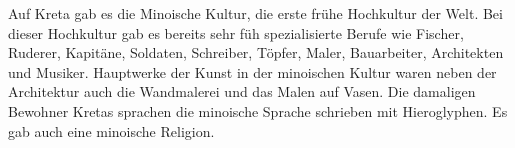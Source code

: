 \documentclass{article}
\begin{document}
 Auf Kreta gab es die Minoische Kultur, die erste frühe
Hochkultur der Welt. Bei dieser Hochkultur gab es bereits sehr füh spezialisierte Berufe wie Fischer, Ruderer, Kapitäne, Soldaten, Schreiber, Töpfer,
Maler, Bauarbeiter, Architekten und  Musiker. Hauptwerke der Kunst in der minoischen Kultur waren neben der Architektur auch die Wandmalerei und das
Malen auf Vasen. Die damaligen Bewohner Kretas sprachen die minoische Sprache schrieben mit Hieroglyphen. Es gab auch eine minoische Religion.  
\end{document}
